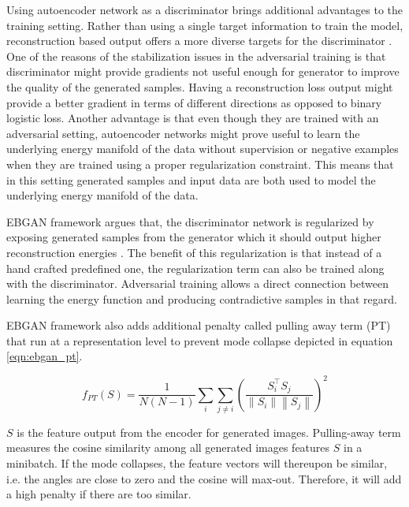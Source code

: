 Using autoencoder network as a discriminator brings additional advantages to the training setting.
Rather than using a single target information to train the model, reconstruction based output offers
a more diverse targets for the discriminator \cite{Zhao2016EnergybasedGA}. One of the reasons of the
stabilization issues in the adversarial training is that discriminator might provide gradients not
useful enough for generator to improve the quality of the generated samples. Having a reconstruction
loss output might provide a better gradient in terms of different directions as opposed to binary
logistic loss. Another advantage is that even though they are trained with an adversarial setting,
autoencoder networks might prove useful to learn the underlying energy manifold of the data without
supervision or negative examples when they are trained using a proper regularization constraint.
This means that in this setting generated samples and input data are both used to model the
underlying energy manifold of the data. 

EBGAN framework argues that, the discriminator network is regularized by exposing generated samples
from the generator  which it should output higher reconstruction energies
\cite{Zhao2016EnergybasedGA}. The benefit of this regularization is that instead of a hand crafted
predefined one, the regularization term can also be trained along with the discriminator.
Adversarial training allows a direct connection between learning the energy function and producing
contradictive samples in that regard. 

EBGAN framework also adds additional penalty called pulling away term (PT) that run at a
representation level to prevent mode collapse depicted in equation \ref{eqn:ebgan_pt}.

\begin{equation}
\label{eqn:ebgan_pt}
	f_{P T}(S)=\frac{1}{N(N-1)} \sum_{i} \sum_{j \neq i}\left(\frac{S_{i}^{\top} S_{j}}{\left\|S_{i}\right\|\left\|S_{j}\right\|}\right)^{2}
\end{equation}

 $S$ is the feature output from the encoder for generated images. Pulling-away term measures the
 cosine similarity among all generated images features $S$ in a minibatch. If the mode collapses,
 the feature vectors will thereupon be similar, i.e. the angles are close to zero and the cosine
 will max-out. Therefore, it will add a high penalty if there are too similar.
 \cite{Zhao2016EnergybasedGA}
 
 

\endgroup
